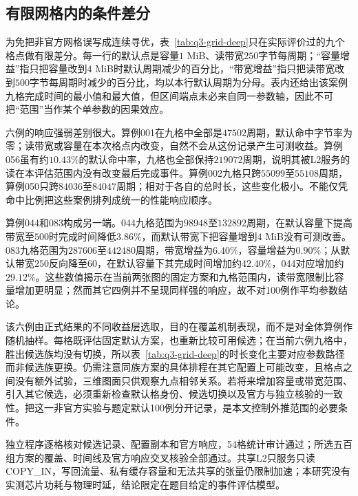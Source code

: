 \subsection{有限网格内的条件差分}

为免把非官方网格误写成连续寻优，表~\ref{tab:q3-grid-deep}只在实际评价过的九个格点做有限差分。每一行的默认点是容量$1$ MiB、读带宽$250$字节每周期；“容量增益”指只把容量改到$4$ MiB时默认周期减少的百分比，“带宽增益”指只把读带宽改到$500$字节每周期时减少的百分比，均以本行默认周期为分母。表内还给出该案例九格完成时间的最小值和最大值，但区间端点未必来自同一参数轴，因此不可把“范围”当作某个单参数的因果效应。



六例的响应强弱差别很大。算例001在九格中全部是$47502$周期，默认命中字节率为零；读带宽或容量在本次格点内改变，自然不会从这份记录产生可测收益。算例056虽有约$10.43\%$的默认命中率，九格也全部保持$219072$周期，说明其被L2服务的读在本评估范围内没有改变最后完成事件。算例002九格只跨$55099$至$55108$周期，算例050只跨$84036$至$84047$周期；相对于各自的总时长，这些变化极小。不能仅凭命中比例把这些案例排列成统一的性能响应顺序。

算例044和083构成另一端。044九格范围为$98948$至$132892$周期，在默认容量下提高带宽至$500$时完成时间降低$3.86\%$，而默认带宽下把容量增到$4$ MiB没有可测改善。083九格范围为$287606$至$442480$周期，带宽增益为$6.40\%$，容量增益为$0.90\%$；从默认带宽$250$反向降至$60$，在默认容量下其完成时间增加约$42.40\%$，044对应增加约$29.12\%$。这些数值揭示在当前两张图的固定方案和九格范围内，读带宽限制比容量增加更明显；然而其它四例并不呈现同样强的响应，故不对100例作平均参数结论。

该六例由正式结果的不同收益层选取，目的在覆盖机制表现，而不是对全体算例作随机抽样。每格既评估固定默认方案，也重新比较可用候选；在当前六例九格中，胜出候选族均没有切换，所以表~\ref{tab:q3-grid-deep}的时长变化主要对应参数路径而非候选族更换。仍需注意同族方案的具体排程在其它配置上可能改变，且格点之间没有额外试验，三维图面只供观察九点相邻关系。若将来增加容量或带宽范围、引入其它候选，必须重新检查默认格身份、候选切换以及官方与独立核验的一致性。把这一非官方实验与题定默认100例分开记录，是本文控制外推范围的必要条件。

独立程序逐格核对候选记录、配置副本和官方响应，54格统计审计通过；所选五百组方案的覆盖、时间线及官方响应交叉核验全部通过。共享L2只服务只读COPY\_IN，写回流量、私有缓存容量和无法共享的张量仍限制加速；本研究没有实测芯片功耗与物理时延，结论限定在题目给定的事件评估模型。




